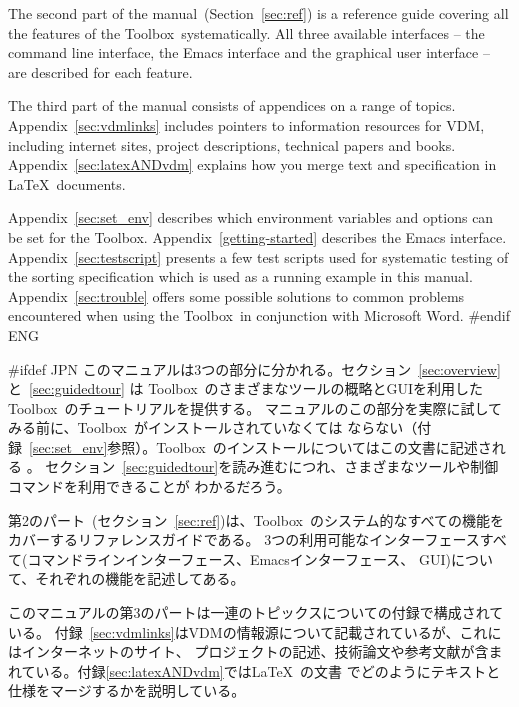 \documentclass[\pformat,12pt]{article}
\newcommand{\Toolbox}{Toolbox}
\newcommand{\Toolbox}{Toolbox}
\begin{document}
The second part of the manual~(Section~\ref{sec:ref}) is a reference
guide covering all the features of the \Toolbox\ systematically. All three
available interfaces -- the command line interface, the Emacs interface
and the graphical user interface -- are described for each feature.

The third part of the manual consists of appendices on a range of
topics. 
 Appendix~\ref{sec:vdmlinks} includes
pointers to information resources for VDM, including internet sites,
project descriptions, technical papers and books.
Appendix~\ref{sec:latexANDvdm} explains how you merge text and
specification in \LaTeX\ documents.

Appendix~\ref{sec:set_env} describes which environment
variables and options can be set for the \Toolbox.
Appendix~\ref{getting-started} describes the Emacs interface.
Appendix~\ref{sec:testscript} presents a few test scripts used for
systematic testing of the sorting specification which is used as a
running example in this manual.  
Appendix~\ref{sec:trouble} offers some possible solutions 
to common problems encountered when using the \Toolbox\ in conjunction
with Microsoft Word.  
#endif ENG

#ifdef JPN
このマニュアルは3つの部分に分かれる。セクション~\ref{sec:overview}と~\ref{sec:guidedtour} は
\Toolbox\ のさまざまなツールの概略とGUIを利用した\Toolbox\ のチュートリアルを提供する。
マニュアルのこの部分を実際に試してみる前に、\Toolbox\ がインストールされていなくては
ならない（付録~\ref{sec:set_env}参照）。\Toolbox\ のインストールについてはこの文書に記述される
。
セクション~\ref{sec:guidedtour}を読み進むにつれ、さまざまなツールや制御コマンドを利用できることが
わかるだろう。

第2のパート~(セクション~\ref{sec:ref})は、\Toolbox\ のシステム的なすべての機能を
カバーするリファレンスガイドである。
3つの利用可能なインターフェースすべて(コマンドラインインターフェース、Emacsインターフェース、
GUI)について、それぞれの機能を記述してある。

このマニュアルの第3のパートは一連のトピックスについての付録で構成されている。
付録~\ref{sec:vdmlinks}はVDMの情報源について記載されているが、これにはインターネットのサイト、
プロジェクトの記述、技術論文や参考文献が含まれている。付録\ref{sec:latexANDvdm}では\LaTeX\ の文書
でどのようにテキストと仕様をマージするかを説明している。
\end{document}
